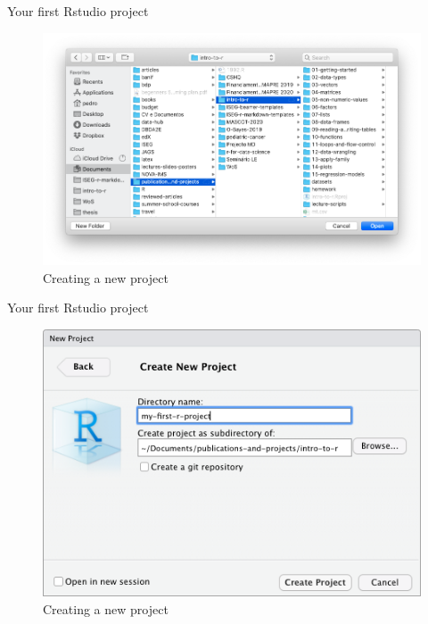 \documentclass[ignorenonframetext,]{beamer}
\begin{document}
\begin{frame}{Your first Rstudio project}
\protect\hypertarget{your-first-rstudio-project-3}{}

\begin{figure}
\includegraphics[scale=0.36]{figures/new-project-4}
\caption{Creating a new project}
\end{figure}

\end{frame}

\begin{frame}{Your first Rstudio project}
\protect\hypertarget{your-first-rstudio-project-4}{}

\begin{figure}
\includegraphics[scale=0.5]{figures/new-project-5}
\caption{Creating a new project}
\end{figure}

\end{frame}
\end{document}
